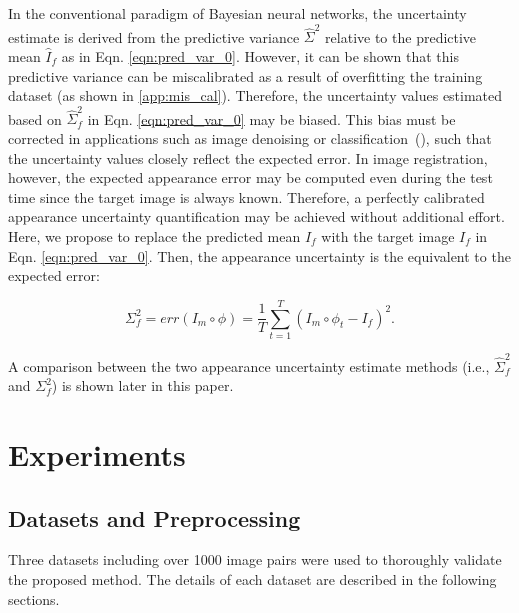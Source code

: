 \documentclass[times,twocolumn,final]{elsarticle}
\begin{document}
In the conventional paradigm of Bayesian neural networks, the uncertainty estimate is derived from the predictive variance $\hat{\Sigma}^2$ relative to the predictive mean $\hat{I}_f$ as in Eqn. \ref{eqn:pred_var_0}. However, it can be shown that this predictive variance can be miscalibrated as a result of overfitting the training dataset (as shown in \ref{app:mis_cal}). Therefore, the uncertainty values estimated based on $\hat{\Sigma}^2_f$ in Eqn. \ref{eqn:pred_var_0} may be biased. This bias must be corrected in applications such as image denoising or classification~(\cite{laves2019well, guo2017calibration, kuleshov2018accurate, phan2018calibrating, laves2020uncertainty, pmlr-v121-laves20a}), such that the uncertainty values closely reflect the expected error. In image registration, however, the expected appearance error may be computed even during the test time since the target image is always known. Therefore, a perfectly calibrated appearance uncertainty quantification may be achieved without additional effort. Here, we propose to replace the predicted mean $\hat{I}_f$ with the target image $I_f$ in Eqn. \ref{eqn:pred_var_0}. Then, the appearance uncertainty is the equivalent to the expected error:
\begin{linenomath}
\begin{equation}
\label{eqn:pred_var_1}
    \Sigma^2_f=err(I_m\circ\phi) = \frac{1}{T}\sum^T_{t=1}\left(I_m\circ\phi_t - I_f\right)^2.
\end{equation}
\end{linenomath}
A comparison between the two appearance uncertainty estimate methods (i.e., $\hat{\Sigma}^2_f$ and $\Sigma^2_f$) is shown later in this paper.

\section{Experiments}
\label{sec:experiments}
\subsection{Datasets and Preprocessing}
Three datasets including over 1000 image pairs were used to thoroughly validate the proposed method. The details of each dataset are described in the following sections.
\end{document}
